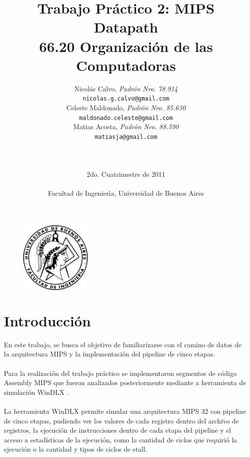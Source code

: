 \documentclass[a4paper,11pt]{article}
\title{ Trabajo Pr\'actico 2: MIPS Datapath   \\
        \Large{ 66.20 Organizaci\'on de las Computadoras } }
\author{Nicol\'as Calvo, \textit{Padr\'on Nro. 78.914}           	\\
            \texttt{ nicolas.g.calvo@gmail.com }      			\\
            Celeste Maldonado, \textit{Padr\'on Nro. 85.630}              	\\
            \texttt{ maldonado.celeste@gmail.com }                             \\
            Matias Acosta, \textit{Padr\'on Nro. 88.590}                \\
            \texttt{ matiasja@gmail.com }                     		\\
            \LARGE{}         						\\
            \LARGE{}         						\\
            \LARGE{}         						\\
            \Large{2do. Cuatrimestre de 2011}         	\\                       
            \texttt{}         						\\
            \Large{Facultad de Ingenier\'\i{}a, Universidad de Buenos Aires}            \\
       }
\date{}
\begin{document}
\marginsize{2cm}{2cm}{2cm}{2cm}

\begin{figure}
\centering
\includegraphics[width=100pt]{logofiuba.jpg}
\end{figure}


\maketitle
\thispagestyle{empty}   %


\newpage

\tableofcontents
\newpage

\setcounter{page}{1}

\section{Introducci\'on}

\paragraph{}
En este trabajo, se busca el objetivo de familiarizarse con el camino de datos de la arquitectura MIPS y la implementaci\'on del pipeline de cinco etapas. 

\paragraph{}
Para la realizaci\'on del trabajo pr\'actico se implementaron segmentos de c\'odigo Assembly MIPS que fueron analizados posteriormente mediante a herramienta de simulaci\'on WinDLX .

\paragraph{}
La herramienta WinDLX permite simular una arquitectura MIPS 32 con pipeline de cinco etapas, pudiendo ver los valores de cada registro dentro del archivo de registros, la ejecuci\'on de instrucciones dentro de cada etapa del pipeline  y el acceso a estad\'isticas  de la ejecuci\'on, como la cantidad de ciclos que requiri\'o la ejecuci\'on o la cantidad y tipos de ciclos de stall.
\end{document}
